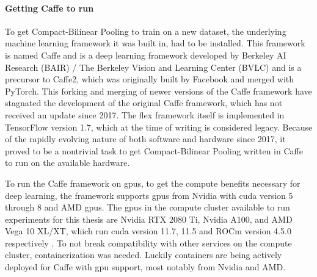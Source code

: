             \paragraph{Getting Caffe to run\\}
            To get Compact-Bilinear Pooling to train on a new dataset, the underlying machine learning framework it was built in, had to be installed. This framework is named Caffe and is a deep learning framework developed by Berkeley AI Research (BAIR) / The Berkeley Vision and Learning Center (BVLC) and is a precursor to Caffe2, which was originally built by Facebook and merged with PyTorch. This forking and merging of newer versions of the Caffe framework have stagnated the development of the original Caffe framework, which has not received an update since 2017. The \gls{flex} framework itself is implemented in TensorFlow version 1.7, which at the time of writing is considered legacy. Because of the rapidly evolving nature of both software and hardware since 2017, it proved to be a nontrivial task to get Compact-Bilinear Pooling written in Caffe to run on the available hardware.

            To run the Caffe framework on \glspl{gpu}, to get the compute benefits necessary for deep learning, the framework supports \glspl{gpu} from Nvidia with \gls{cuda} version 5 through 8 \cite{CaffeInstallation, CaffeDeepLearning} and AMD \glspl{gpu}. The \glspl{gpu} in the compute cluster available to run experiments for this thesis are Nvidia RTX 2080 Ti, Nvidia A100, and AMD Vega 10 XL/XT, which run \gls{cuda} version 11.7, 11.5 and ROCm version 4.5.0 respectively \cite{MLNodesUniversitetet}. To not break compatibility with other services on the compute cluster, containerization was needed. Luckily containers are being actively deployed for Caffe with \gls{gpu} support, most notably from Nvidia and AMD.

